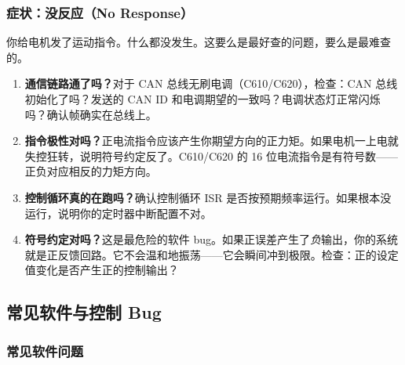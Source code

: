 \subsubsection{症状：没反应（No Response）}

你给电机发了运动指令。什么都没发生。这要么是最好查的问题，要么是最难查的。

\begin{enumerate}
    \item \textbf{通信链路通了吗？}对于 CAN 总线无刷电调（C610/C620），检查：CAN 总线初始化了吗？发送的 CAN ID 和电调期望的一致吗？电调状态灯正常闪烁吗？确认帧确实在总线上。

    \item \textbf{指令极性对吗？}正电流指令应该产生你期望方向的正力矩。如果电机一上电就失控狂转，说明符号约定反了。C610/C620 的 16 位电流指令是有符号数——正负对应相反的力矩方向。

    \item \textbf{控制循环真的在跑吗？}确认控制循环 ISR 是否按预期频率运行。如果根本没运行，说明你的定时器中断配置不对。

    \item \textbf{符号约定对吗？}这是最危险的软件 bug。如果正误差产生了\textit{负}输出，你的系统就是正反馈回路。它不会温和地振荡——它会瞬间冲到极限。检查：正的设定值变化是否产生正的控制输出？
\end{enumerate}

\subsection{常见软件与控制 Bug}

\subsubsection{常见软件问题}

